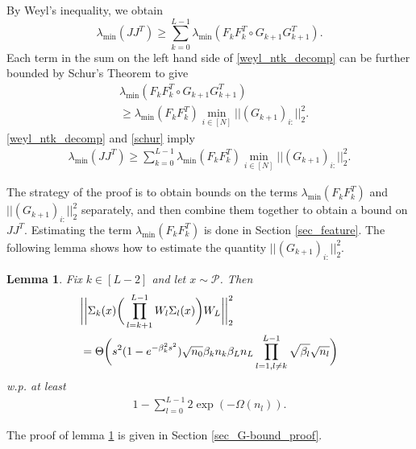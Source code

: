 \documentclass{article}
\theoremstyle{plain}
\newtheorem{lemma}[Theorem]{Lemma}
\theoremstyle{definition}
\theoremstyle{remark}
\begin{document}
By Weyl's inequality, we obtain
\begin{equation}\label{weyl_ntk_decomp}
    \lambda_{\min}(JJ^T) \geq \sum_{k=0}^{L-1}\lambda_{\min}(F_kF_k^T \circ 
    G_{k+1}G_{k+1}^T).
\end{equation}
Each term in the sum on the left hand side of \eqref{weyl_ntk_decomp} can be further bounded by Schur's Theorem \cite{schur1911bemerkungen, horn1994topics} to give
\begin{align}
    &\lambda_{\min}(F_kF_k^T \circ G_{k+1}G_{k+1}^T) \nonumber\\
    &\geq 
\lambda_{\min}(F_kF_k^T)\min_{i \in [N]}\vert\vert (G_{k+1})_{i:}\vert\vert_2^2.
\label{schur}
\end{align}
\eqref{weyl_ntk_decomp} and \eqref{schur} imply
\begin{align}\label{ntk_lower_decomp}
    \lambda_{\min}(JJ^T) \geq  \sum_{k=0}^{L-1}
    \lambda_{\min}(F_kF_k^T)\min_{i \in [N]}\vert\vert (G_{k+1})_{i:}\vert\vert_2^2.
\end{align}

The strategy of the proof is to obtain bounds on the terms 
$\lambda_{\min}(F_kF_k^T)$ and $\vert\vert (G_{k+1})_{i:}\vert\vert_2^2$ separately, and then combine them together to obtain a bound on $JJ^T$. Estimating the term
$\lambda_{\min}(F_kF_k^T)$ is done in Section \ref{sec_feature}. The following 
lemma shows how to estimate the quantity $\vert\vert (G_{k+1})_{i:}\vert\vert_2^2$.

\begin{lemma}\label{G-bound}
Fix $k \in [L-2]$ and let $x \sim \mathcal{P}$. Then 
\begin{align*}
&\bigg{\vert}\bigg{\vert}
\Sigma_k(x)\bigg{(}\prod_{l=k+1}^{L-1}W_l\Sigma_l(x)\bigg{)}W_L
\bigg{\vert}\bigg{\vert}^2_2 \\
&=
    \Theta\bigg{(}
s^2(1 - e^{-\beta_k^2s^2})\sqrt{n_0}\beta_kn_k\beta_{L}n_L
\prod_{l=1, l\neq k}^{L-1}
\sqrt{\beta_l}\sqrt{n_l}
\bigg{)}
\end{align*}
w.p. at least
\begin{align*}
    1 - \sum_{l=0}^{L-1}2\exp(-\Omega(n_l)).
\end{align*}
\end{lemma}

The proof of lemma \ref{G-bound} is given in Section \ref{sec_G-bound_proof}.
\end{document}
